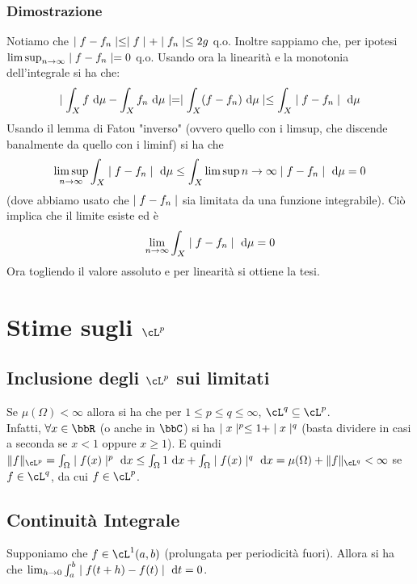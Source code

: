 \documentclass[a4paper,NoNotes,GeneralMath]{stdmdoc}
\begin{document}
	\subsubsection*{Dimostrazione}
	Notiamo che $\mid f - f_n \mid \le \mid f \mid + \mid f_n \mid \le 2 g$ q.o. Inoltre sappiamo che, per ipotesi $\limsup_{n \rightarrow \infty} \mid f - f_n \mid = 0$ q.o. Usando ora la linearità e la monotonia dell'integrale si ha che:
	$$ \abs{\int_X f \de \mu - \int_X f_n \de \mu} = \abs{\int_X (f - f_n) \de \mu} \le \int_X \abs{f - f_n} \de \mu $$
	Usando il lemma di Fatou "inverso" (ovvero quello con i limsup, che discende banalmente da quello con i liminf) si ha che
	$$ \limsup_{n \rar \infty} \int_X \abs{f - f_n} \de \mu \le \int_X \limsup{n \rar \infty} \abs{f - f_n} \de \mu = 0 $$
	(dove abbiamo usato che $\mid f - f_n \mid$ sia limitata da una funzione integrabile). Ciò implica che il limite esiste ed è
	$$ \lim_{n \rar \infty} \int_X \abs{f - f_n} \de \mu = 0 $$
	Ora togliendo il valore assoluto e per linearità si ottiene la tesi.
	
	\section*{Stime sugli $\cL^p$}
	\subsection*{Inclusione degli $\cL^p$ sui limitati}
	Se $\mu(\Omega) < \infty$ allora si ha che per $1 \le p \le q \le \infty$, $\cL^q \subseteq \cL^p$. \\
	Infatti, $\forall x \in \bbR$ (o anche in $\bbC$) si ha $\mid x \mid^p \le 1 + \mid x \mid^q$ (basta dividere in casi a seconda se $x < 1$ oppure $x \ge 1$). E quindi $\norm{f}_{\cL^p} = \int_\Omega \abs{f(x)}^p \de x \le \int_\Omega 1 \de x + \int_\Omega \abs{f(x)}^q \de x = \newline \mu(\Omega) + \norm{f}_{\cL^q} < \infty$ se $f \in \cL^q$, da cui $f \in \cL^p$.
	
	
	\subsection*{Continuità Integrale}
	Supponiamo che $f \in \cL^1(a, b)$ (prolungata per periodicità fuori). Allora si ha che $\lim_{h \rar 0} \int_a^b \abs{f(t + h) - f(t)} \de t = 0$.
	
\end{document}
